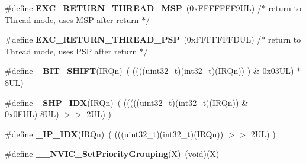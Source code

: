 \begin{DoxyCompactItemize}
\item 
\mbox{\label{group___c_m_s_i_s___core___n_v_i_c_functions_gaea4703101b5e679f695e231f7ee72331}} 
\#define {\bfseries E\+X\+C\+\_\+\+R\+E\+T\+U\+R\+N\+\_\+\+T\+H\+R\+E\+A\+D\+\_\+\+M\+SP}~(0x\+F\+F\+F\+F\+F\+F\+F9\+U\+L)     /$\ast$ return to Thread mode, uses M\+S\+P after return                                $\ast$/
\item 
\mbox{\label{group___c_m_s_i_s___core___n_v_i_c_functions_ga9998daf0fbdf31dbc8f81cd604b58175}} 
\#define {\bfseries E\+X\+C\+\_\+\+R\+E\+T\+U\+R\+N\+\_\+\+T\+H\+R\+E\+A\+D\+\_\+\+P\+SP}~(0x\+F\+F\+F\+F\+F\+F\+F\+D\+U\+L)     /$\ast$ return to Thread mode, uses P\+S\+P after return                                $\ast$/
\item 
\mbox{\label{group___c_m_s_i_s___core___n_v_i_c_functions_ga53c75b28823441c6153269f0ecbed878}} 
\#define {\bfseries \+\_\+\+B\+I\+T\+\_\+\+S\+H\+I\+FT}(I\+R\+Qn)~(  ((((uint32\+\_\+t)(int32\+\_\+t)(I\+R\+Qn))         )      \&  0x03\+U\+L) $\ast$ 8\+U\+L)
\item 
\mbox{\label{group___c_m_s_i_s___core___n_v_i_c_functions_gaee4f7eb5d7e770ad51489dbceabb1755}} 
\#define {\bfseries \+\_\+\+S\+H\+P\+\_\+\+I\+DX}(I\+R\+Qn)~( (((((uint32\+\_\+t)(int32\+\_\+t)(I\+R\+Qn)) \& 0x0\+F\+U\+L)-\/8\+U\+L) $>$$>$    2\+U\+L)      )
\item 
\mbox{\label{group___c_m_s_i_s___core___n_v_i_c_functions_ga370ec4b1751a6a889d849747df3763a9}} 
\#define {\bfseries \+\_\+\+I\+P\+\_\+\+I\+DX}(I\+R\+Qn)~(   (((uint32\+\_\+t)(int32\+\_\+t)(I\+R\+Qn))                $>$$>$    2\+U\+L)      )
\item 
\mbox{\label{group___c_m_s_i_s___core___n_v_i_c_functions_ga6834dd8c9c59394f1b544b57665293a4}} 
\#define {\bfseries \+\_\+\+\_\+\+N\+V\+I\+C\+\_\+\+Set\+Priority\+Grouping}(X)~(void)(X)
\item 
\mbox{\label{group___c_m_s_i_s___core___n_v_i_c_functions_gab2072fe50f6d7cd208f6768919f59fae}} 

\end{DoxyCompactItemize}
